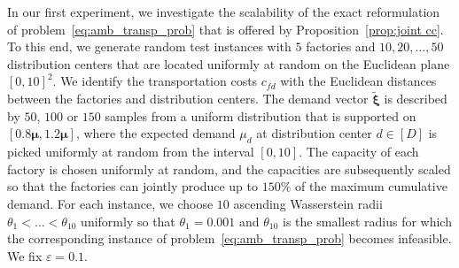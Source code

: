 \documentclass[nonblindrev]{informs2017}
\newcommand{\bmt}[1]{\tilde{\bm{#1}}}
\newcommand{\1}[1]{\mathds{1}{\left(#1\right)}}
\begin{document}
In our first experiment, we investigate the scalability of the exact reformulation of problem~\eqref{eq:amb_transp_prob} that is offered by Proposition~\ref{prop:joint cc}. To this end, we generate random test instances with $5$ factories and $10, 20, \ldots, 50$ distribution centers that are located uniformly at random on the Euclidean plane $[0, 10]^2$. We identify the transportation costs $c_{fd}$ with the Euclidean distances between the factories and distribution centers. The demand vector $\bmt{\xi}$ is described by $50$, $100$ or $150$ samples from a uniform distribution that is supported on $[0.8 \bm{\mu}, 1.2 \bm{\mu}]$, where the expected demand $\mu_d$ at distribution center $d \in [D]$ is picked uniformly at random from the interval $[0, 10]$. The capacity of each factory is chosen uniformly at random, and the capacities are subsequently scaled so that the factories can jointly produce up to $150\%$ of the maximum cumulative demand. For each instance, we choose $10$ ascending Wasserstein radii $\theta_1 < \ldots < \theta_{10}$ uniformly so that $\theta_1 = 0.001$ and $\theta_{10}$ is the smallest radius for which the corresponding instance of problem~\eqref{eq:amb_transp_prob} becomes infeasible. We fix $\varepsilon = 0.1$.
\end{document}
